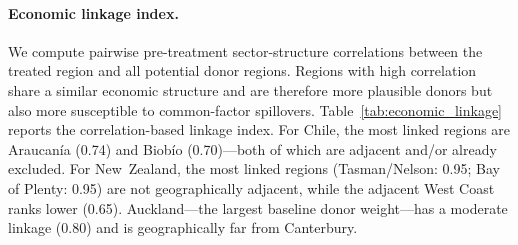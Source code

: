 \documentclass[12pt]{article}
\begin{document}
\paragraph{Economic linkage index.}
We compute pairwise pre-treatment sector-structure correlations between the treated region and all potential donor regions. Regions with high correlation share a similar economic structure and are therefore more plausible donors but also more susceptible to common-factor spillovers. Table~\ref{tab:economic_linkage} reports the correlation-based linkage index. For Chile, the most linked regions are Araucanía (0.74) and Biobío (0.70)---both of which are adjacent and/or already excluded. For New~Zealand, the most linked regions (Tasman/Nelson: 0.95; Bay of Plenty: 0.95) are not geographically adjacent, while the adjacent West Coast ranks lower (0.65). Auckland---the largest baseline donor weight---has a moderate linkage (0.80) and is geographically far from Canterbury.
\end{document}
